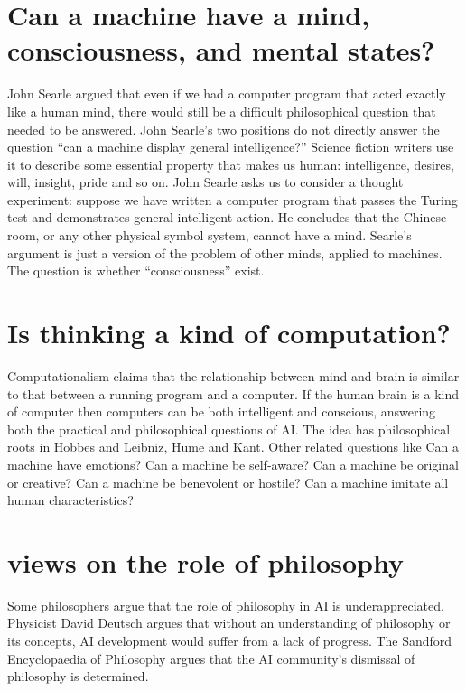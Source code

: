 \documentclass{article}
\begin{document}
\section{Can a machine have a mind, consciousness, and mental states?}
John Searle argued that even if we had a computer program that acted exactly like a human mind, there would still be a difficult philosophical question that needed to be answered. John Searle’s two positions do not directly answer the question “can a machine display general intelligence?”
Science fiction writers use it to describe some essential property that makes us human: intelligence, desires, will, insight, pride and so on. John Searle asks us to consider a thought experiment: suppose we have written a computer program that passes the Turing test and demonstrates general intelligent action. He concludes that the Chinese room, or any other physical symbol system, cannot have a mind. Searle’s argument is just a version of the problem of other minds, applied to machines. The question is whether “consciousness” exist.
\section{Is thinking a kind of computation?}
Computationalism claims that the relationship between mind and brain is similar to that between a running program and a computer. If the human brain is a kind of computer then computers can be both intelligent and conscious, answering both the practical and philosophical questions of AI. The idea has philosophical roots in Hobbes and Leibniz, Hume and Kant. 
Other related questions like Can a machine have emotions? Can a machine be self-aware? Can a machine be original or creative? Can a machine be benevolent or hostile? Can a machine imitate all human characteristics? 
\section{views on the role of philosophy}
Some philosophers argue that the role of philosophy in AI is underappreciated. Physicist David Deutsch argues that without an understanding of philosophy or its concepts, AI development would suffer from a lack of progress. The Sandford Encyclopaedia of Philosophy argues that the AI community’s dismissal of philosophy is determined. 
\end{document}
